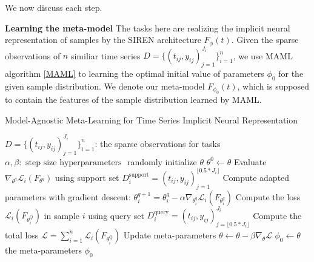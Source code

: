 \documentclass{article}
\begin{document}
We now discuss each step.

\textbf{Learning the meta-model}
The tasks here are realizing the implicit neural representation of samples by the SIREN architecture $F_\phi(t)$.
Given the sparse observations of $n$ similiar time series $D=\{(t_{ij},y_{ij})_{j=1}^{J_i}\}_{i=1}^n$,
we use MAML algorithm \ref{MAML} to learning the optimal initial value of parameters $\phi_0$ for the given sample distribution.
We denote our meta-model $F_{\phi_0}(t)$, which is supposed to contain the features of the sample distribution learned by MAML.


\begin{algorithm}[htb]
	\renewcommand{\algorithmicrequire}{\textbf{Input:}}
	\renewcommand{\algorithmicensure}{\textbf{Output:}}
	\caption{Model-Agnostic Meta-Learning for Time Series Implicit Neural Representation}
	\label{MAML}
	\begin{algorithmic}
    \REQUIRE $D=\{(t_{ij},y_{ij})_{j=1}^{J_i}\}_{i=1}^n$: the sparse observations for tasks
    \REQUIRE $\alpha, \beta: \text { step size hyperparameters }$
		\STATE randomly initialize $\theta$
        \STATE $\theta^0 \gets \theta$
          \STATE Evaluate $\nabla_{\theta^q} \mathcal{L}_{i}\left(F_{\theta^q}\right)$ using support set $D_i^{\text{support}}=(t_{ij},y_{ij})_{j=1}^{\lfloor 0.5*J_i\rfloor }$
          \STATE Compute adapted parameters with gradient descent:
          $\theta_i^{q+1}=\theta_i^q-\alpha \nabla_{\theta_i^q} \mathcal{L}_{i}\left(F_{\theta_i^q}\right)$
        \ENDFOR
        \STATE Compute the loss $\mathcal{L}_{i}\left(F_{\theta_i^Q}\right)$ in sample $i$ using query set $D_i^{\text{query}}=(t_{ij},y_{ij})_{j=\lfloor 0.5*J_i\rfloor }^{J_i}$
      \ENDFOR
      \STATE Compute the total loss $\mathcal{L} = \sum_{i=1}^n \mathcal{L}_{i}\left(F_{\theta_i^Q}\right)$
      \STATE Update meta-parameters $\theta \leftarrow \theta-\beta \nabla_\theta \mathcal{L} $
    \ENDWHILE 
    \STATE $\phi_0 \gets \theta$
		\ENSURE the meta-parameters $\phi_0$
  \end{algorithmic}  
\end{algorithm}
\end{document}
